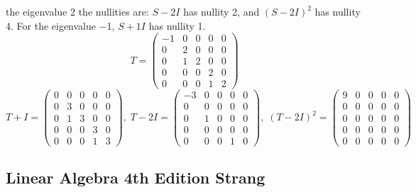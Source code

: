 \documentclass[a4paper]{article}
\begin{document}
\begin{enumerate}
\begin{enumerate}
	the eigenvalue 2 the nullities are: $S − 2I$ has nullity 2,
	and $(S − 2I)^2$ has nullity 4. For the eigenvalue −1,
	$S + 1I$ has nullity 1.
	$$
	T =
	\begin{pmatrix}
	-1&0&0&0&0\\ 0&2&0&0&0\\ 0&1&2&0&0\\ 0&0&0&2&0\\ 0&0&0&1&2
	\end{pmatrix}
	$$
	$$
	T+I = 
	\begin{pmatrix}
	0&0&0&0&0\\ 0&3&0&0&0\\ 0&1&3&0&0\\ 0&0&0&3&0\\ 0&0&0&1&3
	\end{pmatrix}, \;
	T - 2I = 
	\begin{pmatrix}
	-3&0&0&0&0\\ 0&0&0&0&0\\ 0&1&0&0&0\\ 0&0&0&0&0\\ 0&0&0&1&0
	\end{pmatrix}, \;
	(T - 2I)^2 = 
	\begin{pmatrix}
	9&0&0&0&0\\ 0&0&0&0&0\\ 0&0&0&0&0\\ 0&0&0&0&0\\ 0&0&0&0&0
	\end{pmatrix}
	$$
\end{enumerate}
\end{enumerate}

\newpage
\subsection*{Linear Algebra 4th Edition Strang}
\end{document}
